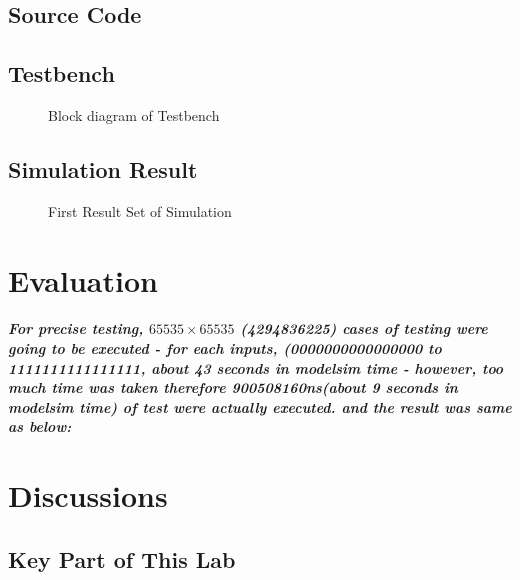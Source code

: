 \documentclass[a4paper]{report}
\begin{document}
        \section{Source Code}
            
        \section{Testbench}
            \begin{figure}[!htb]
                \centering
                \caption {Block diagram of Testbench}
                \label{fig:wf-0}
            \end{figure}
            

        \section{Simulation Result}
            \begin{figure}[!htb]
                \centering
                \caption {First Result Set of Simulation}
                \label{fig:wf-1}
            \end{figure}

    \chapter{Evaluation}
        \paragraph{\normalfont For precise testing, $65535 \times 65535$ (4294836225) cases of testing were going to be executed - for each inputs, (0000000000000000 to 1111111111111111, about 43 seconds in modelsim time - however, too much time was taken therefore 900508160ns(about 9 seconds in modelsim time) of test were actually executed. and the result was same as below:}
        


    \chapter{Discussions}
        \section{Key Part of This Lab}
\end{document}
